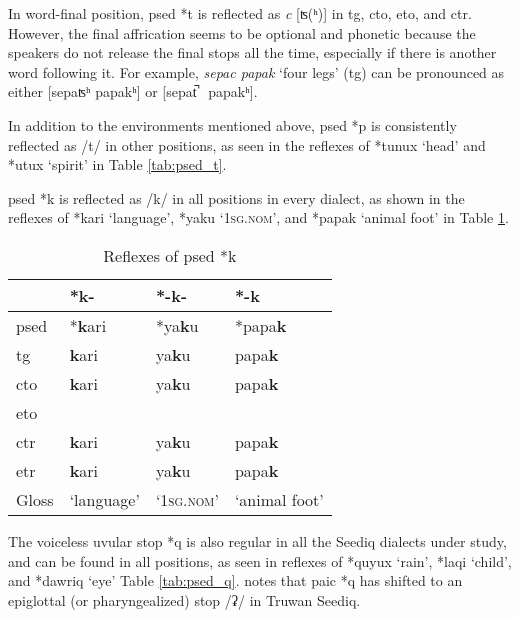 In word-final position, \acl{psed} *t is reflected as \textit{c} [ʦ(ʰ)] in \acl{tg}, \acl{cto}, \acl{eto}, and \acl{ctr}. However, the final affrication seems to be optional and phonetic because the speakers do not release the final stops all the time, especially if there is another word following it. For example, \textit{sepac papak} `four legs' (\acs{tg}) can be pronounced as either [sepaʦʰ papakʰ] or [sepat̚ \ papakʰ]. 

In addition to the environments mentioned above, \acl{psed} *p is consistently reflected as /t/ in other positions, as seen in the reflexes of *tunux `head' and *utux `spirit' in Table \ref{tab:psed_t}.

\acl{psed} *k is reflected as /k/ in all positions in every dialect, as shown in the reflexes of *kari `language', *yaku `\textsc{1sg.nom}', and *papak `animal foot' in Table \ref{tab:psed_k}.

\begin{table}[!htbp]
\centering
\caption{Reflexes of \acl{psed} *k}
\label{tab:psed_k}
\begin{tabular}{llll}
\hline
           & *k-        & *-k-               & *-k           \\ \hline
\acs{psed} & *\textbf{k}ari      & *ya\textbf{k}u              & *papa\textbf{k}        \\ \hdashline
\acs{tg}   & \textbf{k}ari       & ya\textbf{k}u               & papa\textbf{k}         \\
\acs{cto}  & \textbf{k}ari       & ya\textbf{k}u               & papa\textbf{k}         \\
\acs{eto}  &            &                    &               \\
\acs{ctr}  & \textbf{k}ari       & ya\textbf{k}u               & papa\textbf{k}         \\
\acs{etr}  & \textbf{k}ari       & ya\textbf{k}u               & papa\textbf{k}         \\ \hline
Gloss      & `language' & `\textsc{1sg.nom}' & `animal foot' \\ \hline
\end{tabular}
\end{table}

The voiceless uvular stop *q is also regular in all the Seediq dialects under study, and can be found in all positions, as seen in reflexes of *quyux `rain', *laqi `child', and *dawriq `eye' Table \ref{tab:psed_q}. \textcite{li1981paic} notes that \acl{paic} *q has shifted to an epiglottal (or pharyngealized) stop /ʡ/ in Truwan Seediq. 

